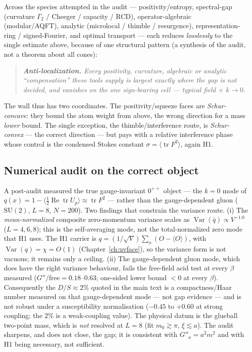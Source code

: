 Across the species attempted in the audit --- positivity/entropy, spectral-gap (curvature
$\Gamma_2$ / Cheeger / capacity / RCD), operator-algebraic (modular/AQFT), analytic (microlocal /
thimble / resurgence), representation-ring / signed-Fourier, and optimal transport --- each reduces
\emph{losslessly} to the single estimate above, because of one structural pattern (a synthesis of
the audit, not a theorem about all cones):
\begin{quote}\itshape
\textbf{Anti-localization.} Every positivity, curvature, algebraic or analytic ``compensation''
these tools supply is largest exactly where the gap is \emph{not} decided, and vanishes on the one
sign-bearing cell --- typical field $\times$ $k\to0$.
\end{quote}
The wall thus has two coordinates. The positivity/squeeze faces are \emph{Schur-concave}: they
bound the atom weight from above, the wrong direction for a mass \emph{lower} bound. The single
exception, the thimble/interference route, is \emph{Schur-convex} --- the correct direction ---
but pays with a relative interference phase whose control is the condensed Stokes constant
$\sigma=\langle\operatorname{tr}F^{2}\rangle$, again H1.

\subsection{Numerical audit on the correct object}

\LE{} A post-audit measured the true gauge-invariant $0^{++}$ object --- the $k=0$ mode of
$q(x)=1-\langle\tfrac12\operatorname{Re}\operatorname{tr}U_p\rangle\approx\operatorname{tr}F^2$
--- rather than the gauge-dependent gluon ($\mathrm{SU}(2)$, $L=8$, $N=200$). Two findings that
constrain the variance route. (i) The \emph{mean-normalized} composite zero-momentum variance
scales as $\operatorname{Var}(\bar q)\propto V^{-1.0}$ ($L=4,6,8$); this is the self-averaging mode,
not the total-normalized zero mode that H1 uses. The H1 carrier is
$q=(1/\sqrt V)\sum_x(O-\langle O\rangle)$, with $\operatorname{Var}(q)=\chi=O(1)$
(Chapter~\ref{ch:uvface}), so the variance form is not vacuous; it remains only a ceiling. (ii) The gauge-dependent gluon mode,
which does have the right variance behaviour, fails the free-field acid test at every $\beta$
measured ($G''/\text{free}=0.18$--$0.63$; one-sided lower bound $<0$ at every $\beta$).
Consequently the $D/S\approx2\%$ quoted in the main text is a compactness/Haar number measured on
that gauge-dependent mode --- not gap evidence --- and is not robust under a susceptibility
normalisation ($-0.45$ to $+0.60$ at strong coupling; the $2\%$ is a weak-coupling value). The
physical datum is the glueball two-point mass, which is \emph{not} resolved at $L=8$ (fit
$m_0\gtrsim\pi$, $\xi\lesssim a$). The audit sharpens, and does not close, the gap; it is
consistent with $G''_a=a^2m^2$ and with H1 being necessary, not sufficient.

